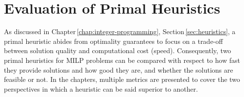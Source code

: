 

\chapter{Evaluation of Primal Heuristics}\label{chap:evaluation}

As discussed in Chapter\,\ref{chap:integer-programming}, Section\,\ref{sec:heuristics}, a primal heuristic abides from optimality guarantees to focus on a trade-off between solution quality and computational cost (speed).
Consequently, two primal heuristics for MILP problems can be compared with respect to how fast they provide solutions and how good they are, and whether the solutions are feasible or not.
In the chapters, multiple metrics are presented to cover the two perspectives in which a heuristic can be said superior to another.


\section*{}

